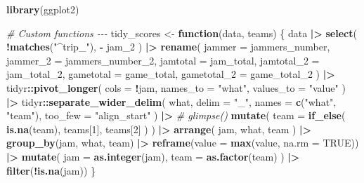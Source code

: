 \documentclass[
]{article}
\newenvironment{Shaded}{\begin{snugshade}}{\end{snugshade}}
\newcommand{\AttributeTok}[1]{\textcolor[rgb]{0.13,0.29,0.53}{#1}}
\newcommand{\CommentTok}[1]{\textcolor[rgb]{0.56,0.35,0.01}{\textit{#1}}}
\newcommand{\ConstantTok}[1]{\textcolor[rgb]{0.56,0.35,0.01}{#1}}
\newcommand{\ControlFlowTok}[1]{\textcolor[rgb]{0.13,0.29,0.53}{\textbf{#1}}}
\newcommand{\DecValTok}[1]{\textcolor[rgb]{0.00,0.00,0.81}{#1}}
\newcommand{\FunctionTok}[1]{\textcolor[rgb]{0.13,0.29,0.53}{\textbf{#1}}}
\newcommand{\NormalTok}[1]{#1}
\newcommand{\OtherTok}[1]{\textcolor[rgb]{0.56,0.35,0.01}{#1}}
\newcommand{\SpecialCharTok}[1]{\textcolor[rgb]{0.81,0.36,0.00}{\textbf{#1}}}
\newcommand{\StringTok}[1]{\textcolor[rgb]{0.31,0.60,0.02}{#1}}
\begin{document}
\begin{Shaded}
\begin{Highlighting}[]
\FunctionTok{library}\NormalTok{(ggplot2)}


\CommentTok{\# Custom functions {-}{-}{-}}
\NormalTok{tidy\_scores }\OtherTok{\textless{}{-}} \ControlFlowTok{function}\NormalTok{(data, teams) \{}
\NormalTok{  data }\SpecialCharTok{|\textgreater{}} 
    \FunctionTok{select}\NormalTok{(}
      \SpecialCharTok{!}\FunctionTok{matches}\NormalTok{(}\StringTok{"\^{}trip\_"}\NormalTok{),}
      \SpecialCharTok{{-}}\NormalTok{ jam\_2}
\NormalTok{    ) }\SpecialCharTok{|\textgreater{}} 
    \FunctionTok{rename}\NormalTok{(}
      \AttributeTok{jammer =}\NormalTok{ jammers\_number,}
      \AttributeTok{jammer\_2 =}\NormalTok{ jammers\_number\_2,}
      \AttributeTok{jamtotal =}\NormalTok{ jam\_total,}
      \AttributeTok{jamtotal\_2 =}\NormalTok{ jam\_total\_2,}
      \AttributeTok{gametotal =}\NormalTok{ game\_total,}
      \AttributeTok{gametotal\_2 =}\NormalTok{ game\_total\_2}
\NormalTok{    ) }\SpecialCharTok{|\textgreater{}}
\NormalTok{    tidyr}\SpecialCharTok{::}\FunctionTok{pivot\_longer}\NormalTok{(}
      \AttributeTok{cols =} \SpecialCharTok{!}\NormalTok{jam,}
      \AttributeTok{names\_to =} \StringTok{"what"}\NormalTok{,}
      \AttributeTok{values\_to =} \StringTok{"value"}
\NormalTok{    ) }\SpecialCharTok{|\textgreater{}} 
\NormalTok{    tidyr}\SpecialCharTok{::}\FunctionTok{separate\_wider\_delim}\NormalTok{(}
\NormalTok{      what,}
      \AttributeTok{delim =} \StringTok{"\_"}\NormalTok{,}
      \AttributeTok{names =} \FunctionTok{c}\NormalTok{(}\StringTok{"what"}\NormalTok{, }\StringTok{"team"}\NormalTok{),}
      \AttributeTok{too\_few =} \StringTok{"align\_start"}
\NormalTok{    ) }\SpecialCharTok{|\textgreater{}} 
    \CommentTok{\# glimpse()}
    \FunctionTok{mutate}\NormalTok{(}
      \AttributeTok{team =} \FunctionTok{if\_else}\NormalTok{(}
        \FunctionTok{is.na}\NormalTok{(team),}
\NormalTok{        teams[}\DecValTok{1}\NormalTok{],}
\NormalTok{        teams[}\DecValTok{2}\NormalTok{]}
\NormalTok{      )}
\NormalTok{    ) }\SpecialCharTok{|\textgreater{}} 
    \FunctionTok{arrange}\NormalTok{(}
\NormalTok{      jam,}
\NormalTok{      what,}
\NormalTok{      team}
\NormalTok{    ) }\SpecialCharTok{|\textgreater{}} 
    \FunctionTok{group\_by}\NormalTok{(jam, what, team) }\SpecialCharTok{|\textgreater{}} 
    \FunctionTok{reframe}\NormalTok{(}\AttributeTok{value =} \FunctionTok{max}\NormalTok{(value, }\AttributeTok{na.rm =} \ConstantTok{TRUE}\NormalTok{)) }\SpecialCharTok{|\textgreater{}} 
    \FunctionTok{mutate}\NormalTok{(}
      \AttributeTok{jam =} \FunctionTok{as.integer}\NormalTok{(jam),}
      \AttributeTok{team =} \FunctionTok{as.factor}\NormalTok{(team)}
\NormalTok{    ) }\SpecialCharTok{|\textgreater{}} 
    \FunctionTok{filter}\NormalTok{(}\SpecialCharTok{!}\FunctionTok{is.na}\NormalTok{(jam))}
\NormalTok{\}}


\end{Highlighting}
\end{Shaded}
\end{document}
